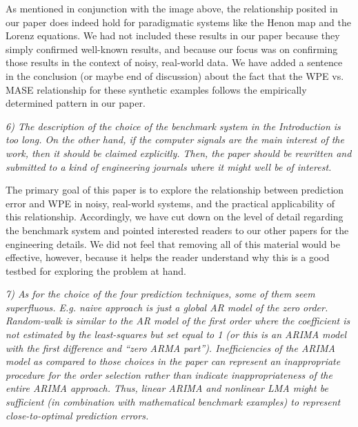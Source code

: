\documentclass[12pt]{article}
\newcommand{\alert}[1]{{\color{red}#1}}
\begin{document}
As mentioned in conjunction with the image above, the relationship
posited in our paper does indeed hold for paradigmatic systems like
the Henon map and the Lorenz equations.  We had not included these
results in our paper because they simply confirmed well-known results,
and because our focus was on confirming those results in the context
of noisy, real-world data.  \alert{We have added a sentence in the
  conclusion (or maybe end of discussion) about the fact that the WPE
  vs. MASE relationship for these synthetic examples follows the
  empirically determined pattern in our paper.}

\emph{6) The description of the choice of the benchmark system in the
  Introduction is too long. On the other hand, if the computer signals
  are the main interest of the work, then it should be claimed
  explicitly. Then, the paper should be rewritten and submitted to a
  kind of engineering journals where it might well be of interest.}

The primary goal of this paper is to explore the relationship between
prediction error and WPE in noisy, real-world systems, and the
practical applicability of this relationship.  Accordingly, we have
cut down on the level of detail regarding the benchmark system and
pointed interested readers to our other papers for the engineering
details.  We did not feel that removing all of this material would
be effective, however, because it helps the reader understand why
this is a good testbed for exploring the problem at hand.

\emph{7) As for the choice of the four prediction techniques, some of
  them seem superfluous. E.g. naive approach is just a global AR model
  of the zero order.  Random-walk is similar to the AR model of the
  first order where the coefficient is not estimated by the
  least-squares but set equal to 1 (or this is an ARIMA model with the
  first difference and ``zero ARMA part''). Inefficiencies of the
  ARIMA model as compared to those choices in the paper can represent
  an inappropriate procedure for the order selection rather than
  indicate inappropriateness of the entire ARIMA approach. Thus,
  linear ARIMA and nonlinear LMA might be sufficient (in combination
  with mathematical benchmark examples) to represent close-to-optimal
  prediction errors.}
\end{document}
